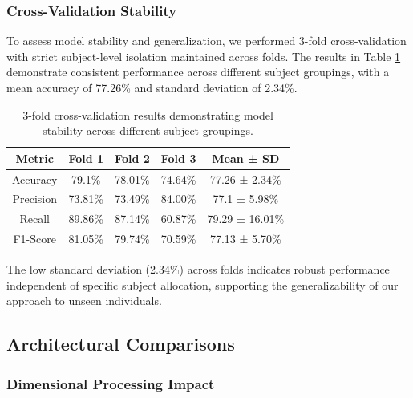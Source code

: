 \documentclass[12pt, a4paper]{article}
\begin{document}
\subsubsection{Cross-Validation Stability}

To assess model stability and generalization, we performed 3-fold cross-validation with strict subject-level isolation maintained across folds. The results in Table \ref{tab:cross_validation} demonstrate consistent performance across different subject groupings, with a mean accuracy of 77.26\% and standard deviation of 2.34\%.

\begin{table}[htbp]
\centering
\begin{tabular}{|c|c|c|c|c|}
\hline
\textbf{Metric} & \textbf{Fold 1} & \textbf{Fold 2} & \textbf{Fold 3} & \textbf{Mean ± SD} \\
\hline
Accuracy & 79.1\% & 78.01\% & 74.64\% & 77.26 ± 2.34\% \\
\hline
Precision & 73.81\% & 73.49\% & 84.00\% & 77.1 ± 5.98\% \\
\hline
Recall & 89.86\% & 87.14\% & 60.87\% & 79.29 ± 16.01\% \\
\hline
F1-Score & 81.05\% & 79.74\% & 70.59\% & 77.13 ± 5.70\% \\
\hline
\end{tabular}
\caption{3-fold cross-validation results demonstrating model stability across different subject groupings.}
\label{tab:cross_validation}
\end{table}

The low standard deviation (2.34\%) across folds indicates robust performance independent of specific subject allocation, supporting the generalizability of our approach to unseen individuals.

\subsection{Architectural Comparisons}

\subsubsection{Dimensional Processing Impact}
\end{document}
